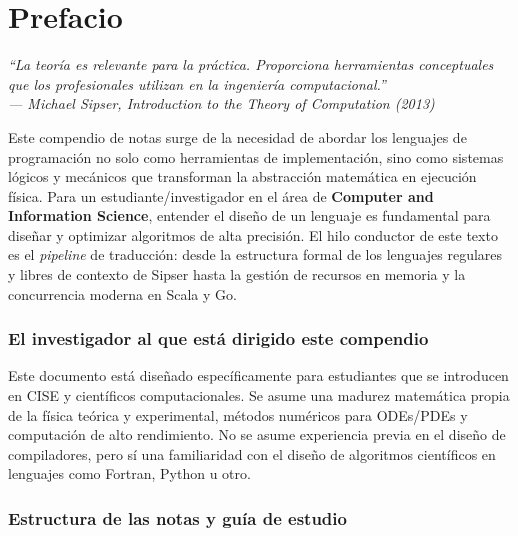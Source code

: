 
\chapter*{Prefacio}

\begin{flushright}
\itshape
``La teoría es relevante para la práctica. Proporciona herramientas conceptuales que los profesionales utilizan en la ingeniería computacional.''\\[4pt]
\upshape --- Michael Sipser, \textup{Introduction to the Theory of Computation} (2013)
\end{flushright}
\bigskip

Este compendio de notas surge de la necesidad de abordar los lenguajes de programación no solo como herramientas de implementación, sino como sistemas lógicos y mecánicos que transforman la abstracción matemática en ejecución física. Para un estudiante/investigador en el área de \textbf{Computer and Information Science}, entender el diseño de un lenguaje es fundamental para diseñar y optimizar algoritmos de alta precisión. El hilo conductor de este texto es el \textit{pipeline} de traducción: desde la estructura formal de los lenguajes regulares y libres de contexto de Sipser hasta la gestión de recursos en memoria y la concurrencia moderna en Scala y Go.

\subsection*{El investigador al que está dirigido este compendio}

Este documento está diseñado específicamente para estudiantes que se introducen en CISE y científicos computacionales. Se asume una madurez matemática propia de la física teórica y experimental, métodos numéricos para ODEs/PDEs y computación de alto rendimiento. No se asume experiencia previa en el diseño de compiladores, pero sí una familiaridad con el diseño de algoritmos científicos en lenguajes como Fortran, Python u otro.

\subsection*{Estructura de las notas y guía de estudio}

